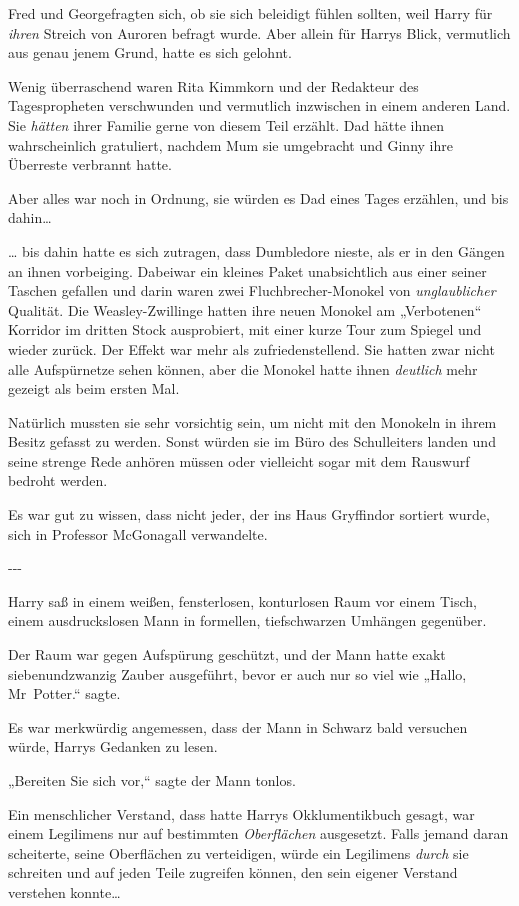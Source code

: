 {Fred und Georgefragten sich, ob sie sich beleidigt fühlen sollten, weil Harry für \emph{ihren} Streich von Auroren befragt wurde. Aber allein für Harrys Blick, vermutlich aus genau jenem Grund, hatte es sich gelohnt.

Wenig überraschend waren Rita Kimmkorn und der Redakteur des Tagespropheten verschwunden und vermutlich inzwischen in einem anderen Land. Sie \emph{hätten} ihrer Familie gerne von diesem Teil erzählt. Dad hätte ihnen wahrscheinlich gratuliert, nachdem Mum sie umgebracht und Ginny ihre Überreste verbrannt hatte.

Aber alles war noch in Ordnung, sie würden es Dad eines Tages erzählen, und bis dahin…

… bis dahin hatte es sich zutragen, dass Dumbledore nieste, als er in den Gängen an ihnen vorbeiging. Dabeiwar ein kleines Paket unabsichtlich aus einer seiner Taschen gefallen und darin waren zwei Fluchbrecher-Monokel von \emph{unglaublicher} Qualität. Die Weasley-Zwillinge hatten ihre neuen Monokel am „Verbotenen“ Korridor im dritten Stock ausprobiert, mit einer kurze Tour zum Spiegel und wieder zurück. Der Effekt war mehr als zufriedenstellend. Sie hatten zwar nicht alle Aufspürnetze sehen können, aber die Monokel hatte ihnen \emph{deutlich} mehr gezeigt als beim ersten Mal.

Natürlich mussten sie sehr vorsichtig sein, um nicht mit den Monokeln in ihrem Besitz gefasst zu werden. Sonst würden sie im Büro des Schulleiters landen und seine strenge Rede anhören müssen oder vielleicht sogar mit dem Rauswurf bedroht werden.

Es war gut zu wissen, dass nicht jeder, der ins Haus Gryffindor sortiert wurde, sich in Professor McGonagall verwandelte.

-\/-\/-

Harry saß in einem weißen, fensterlosen, konturlosen Raum vor einem Tisch, einem ausdruckslosen Mann in formellen, tiefschwarzen Umhängen gegenüber.

Der Raum war gegen Aufspürung geschützt, und der Mann hatte exakt siebenundzwanzig Zauber ausgeführt, bevor er auch nur so viel wie „Hallo, Mr~Potter.“ sagte.

Es war merkwürdig angemessen, dass der Mann in Schwarz bald versuchen würde, Harrys Gedanken zu lesen.

„Bereiten Sie sich vor,“ sagte der Mann tonlos.

Ein menschlicher Verstand, dass hatte Harrys Okklumentikbuch gesagt, war einem Legilimens nur auf bestimmten \emph{Oberflächen} ausgesetzt. Falls jemand daran scheiterte, seine Oberflächen zu verteidigen, würde ein Legilimens \emph{durch} sie schreiten und auf jeden Teile zugreifen können, den sein eigener Verstand verstehen konnte…

}
